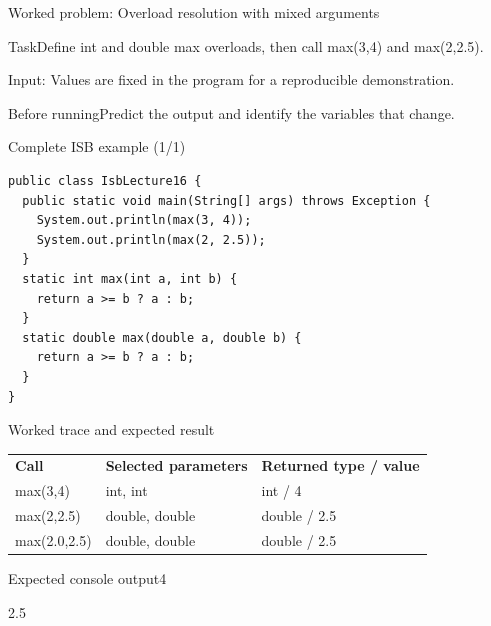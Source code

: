 \documentclass[10pt,aspectratio=169]{beamer}
\begin{document}
\begin{frame}[fragile,t]{Worked problem: Overload resolution with mixed arguments}
\begin{block}{Task}Define int and double max overloads, then call max(3,4) and max(2,2.5).\end{block}
\small Input: Values are fixed in the program for a reproducible demonstration.\par\vspace{3mm}\begin{exampleblock}{Before running}Predict the output and identify the variables that change.\end{exampleblock}
\end{frame}

\begin{frame}[fragile,t]{Complete ISB example (1/1)}
\begin{lstlisting}
public class IsbLecture16 {
  public static void main(String[] args) throws Exception {
    System.out.println(max(3, 4));
    System.out.println(max(2, 2.5));
  }
  static int max(int a, int b) {
    return a >= b ? a : b;
  }
  static double max(double a, double b) {
    return a >= b ? a : b;
  }
}
\end{lstlisting}
\end{frame}

\begin{frame}[fragile,t]{Worked trace and expected result}
\small\renewcommand{\arraystretch}{1.4}
\begin{tabularx}{\textwidth}{>{\raggedright\arraybackslash}X>{\raggedright\arraybackslash}X>{\raggedright\arraybackslash}X}\rowcolor{navy}
\color{white}\bfseries Call & \color{white}\bfseries Selected parameters & \color{white}\bfseries Returned type / value\\
max(3,4) & int, int & int / 4\\
max(2,2.5) & double, double & double / 2.5\\
max(2.0,2.5) & double, double & double / 2.5\\
\end{tabularx}\par\vspace{2mm}
\begin{block}{Expected console output}\ttfamily\footnotesize 4\par 2.5\end{block}
\end{frame}
\end{document}

